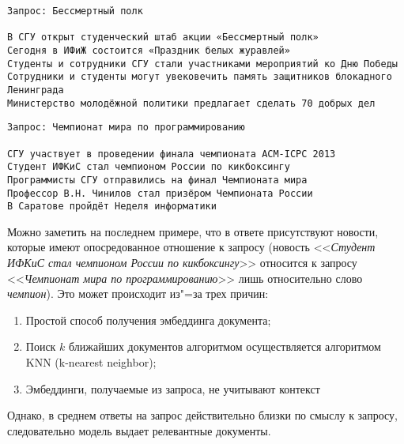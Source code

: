 \documentclass[coursework]{SCWorks}
\begin{document}
\begin{verbatim}
Запрос: Бессмертный полк

В СГУ открыт студенческий штаб акции «Бессмертный полк»
Сегодня в ИФиЖ состоится «Праздник белых журавлей»
Студенты и сотрудники СГУ стали участниками мероприятий ко Дню Победы
Сотрудники и студенты могут увековечить память защитников блокадного Ленинграда
Министерство молодёжной политики предлагает сделать 70 добрых дел
\end{verbatim}

\begin{verbatim}
Запрос: Чемпионат мира по программированию

СГУ участвует в проведении финала чемпионата ACM-ICPC 2013
Студент ИФКиС стал чемпионом России по кикбоксингу
Программисты СГУ отправились на финал Чемпионата мира
Профессор В.Н. Чинилов стал призёром Чемпионата России
В Саратове пройдёт Неделя информатики
\end{verbatim}

Можно заметить на последнем примере, что в ответе присутствуют новости, которые имеют опосредованное отношение к запросу (новость <<\textit{Студент ИФКиС стал чемпионом России по кикбоксингу}>> относится к запросу <<\textit{Чемпионат мира по программированию}>> лишь относительно слово \textit{чемпион}). Это может происходит из"=за трех причин:
\begin{enumerate}
    \item Простой способ получения эмбеддинга документа;
    \item Поиск $k$ ближайших документов алгоритмом осуществляется алгоритмом KNN (k-nearest neighbor);
    \item Эмбеддинги, получаемые из запроса, не учитывают контекст
\end{enumerate}

Однако, в среднем ответы на запрос действительно близки по смыслу к запросу, следовательно модель выдает релевантные документы. 
\conclusion
\end{document}
